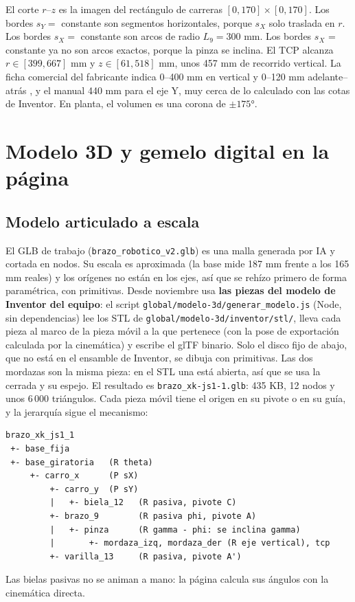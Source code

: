 \documentclass[a4paper,12pt]{article}
\newcommand{\codigo}[1]{\texttt{\small #1}}
\begin{document}
El corte $r$--$z$ es la imagen del rectángulo de carreras $[0,170]\times[0,170]$. Los bordes $s_Y = $ constante son
segmentos horizontales, porque $s_X$ solo traslada en $r$. Los bordes $s_X = $ constante son arcos de radio
$L_9 = 300$ mm. Los bordes $s_X$ = constante ya no son arcos exactos, porque la pinza se inclina. El TCP alcanza $r \in [399, 667]$ mm y $z \in [61, 518]$ mm, unos 457 mm de recorrido
vertical. La ficha comercial del fabricante indica 0--400 mm en vertical y 0--120 mm adelante--atrás
\cite{ficha}, y el manual 440 mm para el eje Y, muy cerca de lo calculado con las cotas de Inventor. En planta, el volumen es una corona de $\pm175°$.

\section{Modelo 3D y gemelo digital en la página}

\subsection{Modelo articulado a escala}
El GLB de trabajo (\codigo{brazo\_robotico\_v2.glb}) es una malla generada por IA y cortada en nodos. Su escala
es aproximada (la base mide 187 mm frente a los 165 mm reales) y los orígenes no están en los ejes, así que
se rehízo primero de forma paramétrica, con primitivas. Desde noviembre usa \textbf{las piezas del modelo de
Inventor del equipo}: el script \codigo{global/modelo-3d/generar\_modelo.js} (Node, sin dependencias) lee los
STL de \codigo{global/modelo-3d/inventor/stl/}, lleva cada pieza al marco de la pieza móvil a la que pertenece
(con la pose de exportación calculada por la cinemática) y escribe el glTF binario. Solo el disco fijo de abajo,
que no está en el ensamble de Inventor, se dibuja con primitivas. Las dos mordazas son la misma pieza: en el
STL una está abierta, así que se usa la cerrada y su espejo. El resultado es \codigo{brazo\_xk-js1-1.glb}:
435 KB, 12 nodos y unos 6\,000 triángulos. Cada pieza móvil tiene el origen en su pivote o en su guía, y la jerarquía sigue el mecanismo:
\begin{lstlisting}
brazo_xk_js1_1
 +- base_fija
 +- base_giratoria   (R theta)
     +- carro_x      (P sX)
         +- carro_y  (P sY)
         |   +- biela_12   (R pasiva, pivote C)
         +- brazo_9        (R pasiva phi, pivote A)
         |   +- pinza      (R gamma - phi: se inclina gamma)
         |       +- mordaza_izq, mordaza_der (R eje vertical), tcp
         +- varilla_13     (R pasiva, pivote A')
\end{lstlisting}
Las bielas pasivas no se animan a mano: la página calcula sus ángulos con la cinemática directa.
\end{document}
